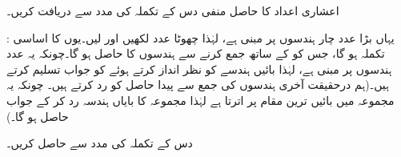  اعشاری اعداد کا حاصل منفی  دس کے تکملہ کی مدد سے دریافت کریں۔ 
 
:\quad 
یہاں بڑا عدد  چار ہندسوں پر مبنی ہے، لہٰذا چھوٹا عدد  لکھیں اور  لیں۔یوں  کا اساسی تکملہ  ہو گا، جس کو  کے ساتھ جمع کرنے سے  ہندسوں کا   حاصل ہو گا۔چونکہ یہ عدد  ہندسوں پر مبنی ہے، لہٰذا بائیں ہندسے کو نظر انداز کرتے ہوئے  کو جواب تسلیم کرتے ہیں۔(ہم درحقیقت آخری ہندسوں کی جمع سے پیدا حاصل  کو رد کرتے ہیں۔ چونکہ یہ مجموعہ میں بائیں ترین مقام پر اترتا ہے لہٰذا مجموعہ کا بایاں ہندسہ رد کر کے جواب حاصل ہو گا۔)
\begin{center}
\begin{otherlanguage}{english}
\quad\quad
{}
\end{otherlanguage}
\end{center}
دس کے تکملہ کی مدد سے  حاصل کریں۔ 

